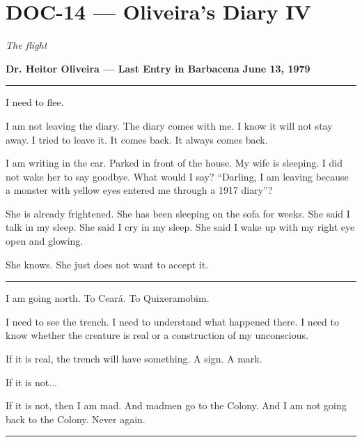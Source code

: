 \section*{\textbf{DOC-14} --- Oliveira's Diary IV}

\noindent \textit{The flight}

\noindent \textbf{Dr. Heitor Oliveira --- Last Entry in Barbacena}
\textbf{June 13, 1979}

\vspace{0.5em}\noindent\rule{\textwidth}{0.5pt}\vspace{0.5em}

\noindent I need to flee.

\noindent I am not leaving the diary. The diary comes with me. I know it will not stay away. I tried to leave it. It comes back. It always comes back.

\noindent I am writing in the car. Parked in front of the house. My wife is sleeping. I did not wake her to say goodbye. What would I say? \textquotedblleft{}Darling, I am leaving because a monster with yellow eyes entered me through a 1917 diary\textquotedblright{}?

\noindent She is already frightened. She has been sleeping on the sofa for weeks. She said I talk in my sleep. She said I cry in my sleep. She said I wake up with my right eye open and glowing.

\noindent She knows.
She just does not want to accept it.

\vspace{0.5em}\noindent\rule{\textwidth}{0.5pt}\vspace{0.5em}

\noindent I am going north. To Ceará. To Quixeramobim.

\noindent I need to see the trench. I need to understand what happened there. I need to know whether the creature is real or a construction of my unconscious.

\noindent If it is real, the trench will have something. A sign. A mark.

\noindent If it is not...

\noindent If it is not, then I am mad. And madmen go to the Colony. And I am not going back to the Colony. Never again.

\vspace{0.5em}\noindent\rule{\textwidth}{0.5pt}\vspace{0.5em}

